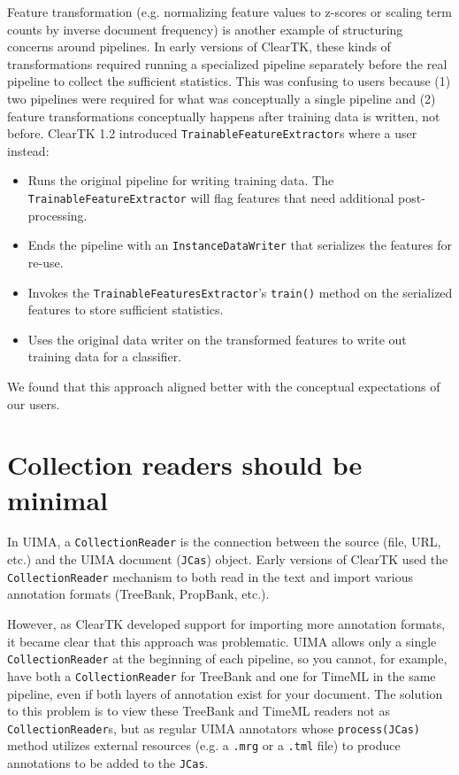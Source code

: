 \documentclass[10pt, a4paper]{article}
\newcommand{\code}[1]{\texttt{\small #1}}
\begin{document}
Feature transformation (e.g. normalizing feature values to z-scores or scaling term counts by inverse document frequency) is another example of structuring concerns around pipelines.
In early versions of ClearTK, these kinds of transformations required running a specialized pipeline separately before the real pipeline to collect the sufficient statistics.
This was confusing to users because (1) two pipelines were required for what was conceptually a single pipeline and (2) feature transformations conceptually happens after training data is written, not before.
ClearTK 1.2 introduced \code{TrainableFeatureExtractor}s where a user instead:
\begin{itemize}
\item Runs the original pipeline for writing training data. The \code{TrainableFeatureExtractor} will flag features that need additional post-processing.
\item Ends the pipeline with an \code{InstanceDataWriter} that serializes the features for re-use.
\item Invokes the \code{TrainableFeaturesExtractor}'s \code{train()} method on the serialized features to store sufficient statistics.
\item Uses the original data writer on the transformed features to write out training data for a classifier.
\end{itemize}
We found that this approach aligned better with the conceptual expectations of our users.


\section{Collection readers should be minimal}
In UIMA, a \code{CollectionReader} is the connection between the source (file, URL, etc.) and the UIMA document (\code{JCas}) object.
Early versions of ClearTK used the \code{CollectionReader} mechanism to both read in the text and import various annotation formats (TreeBank, PropBank, etc.).

However, as ClearTK developed support for importing more annotation formats, it became clear that this approach was problematic.
UIMA allows only a single \code{CollectionReader} at the beginning of each pipeline, so you cannot, for example, have both a \code{CollectionReader} for TreeBank and one for TimeML in the same pipeline, even if both layers of annotation exist for your document.
The solution to this problem is to view these TreeBank and TimeML readers not as \code{CollectionReader}s, but as regular UIMA annotators whose \code{process(JCas)} method utilizes external resources (e.g. a \code{.mrg} or a \code{.tml} file) to produce annotations to be added to the \code{JCas}.
\end{document}

